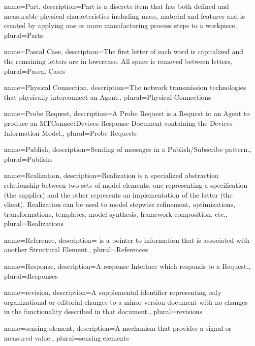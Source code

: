 {
    name={Part},
	description={\gls{Part} is a discrete item that has both defined and measurable physical characteristics including mass, material and features and is created by applying one or more manufacturing process steps to a workpiece},
	plural={Parts}
}

{
    name={Pascal Case},
	description={The first letter of each word is capitalized and the remaining letters are in lowercase. All space is removed between letters},
	plural={Pascal Cases}
}

{
    name={Physical Connection},
	description={The network transmission technologies that physically interconnect an \gls{Agent}.},
	plural={Physical Connections}
}

{
    name={Probe Request},
	description={A \gls{Probe Request} is a \gls{Request} to an \gls{Agent} to produce an \gls{MTConnectDevices Response Document} containing the \gls{Devices Information Model}.},
	plural={Probe Requests}
}

{
    name={Publish},
	description={Sending of messages in a \gls{Publish/Subscribe} pattern.},
	plural={Publishs}
}

{
    name={Realization},
	description={Realization is a specialized abstraction relationship between two sets of model elements, one representing a specification (the supplier) and the other represents an implementation of the latter (the client). Realization can be used to model stepwise refinement, optimizations, transformations, templates, model synthesis, framework composition, etc.},
	plural={Realizations}
}

{
    name={Reference},
	description={ is a pointer to information that is associated with another \gls{Structural Element}.},
	plural={References}
}

{
    name={Response},
	description={A response \gls{Interface} which responds to a \gls{Request}.},
	plural={Responses}
}

{
    name={revision},
	description={A supplemental identifier representing only organizational or editorial changes to a \gls{minor} version document with no changes in the functionality described in that document.},
	plural={revisions}
}

{
    name={sensing element},
	description={A mechanism that provides a signal or measured value.},
	plural={sensing elements}
}


